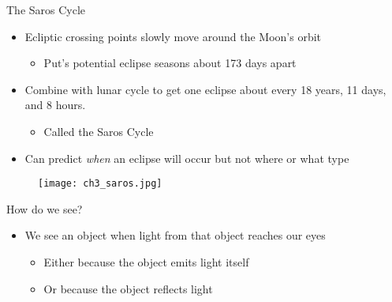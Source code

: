 \documentclass[pdf,aspectratio=169]{beamer}
\begin{document}
\begin{frame}{The Saros Cycle}
  \begin{itemize}
	\item Ecliptic crossing points slowly move around the Moon's orbit
	  \begin{itemize}
		\item Put's potential eclipse seasons about 173 days apart
	  \end{itemize}
	\item Combine with lunar cycle to get one eclipse about every 18 years, 11 days, and 8 hours.
	  \begin{itemize}
		\item Called the \alert{Saros Cycle}
	  \end{itemize}
	\item Can predict \emph{when} an eclipse will occur but not where or what type
  \end{itemize}
  \begin{figure}[h!]
	\centering
	\texttt{[image: ch3\_saros.jpg]}
  \end{figure}
\end{frame}


\begin{frame}{How do we see?}
  \begin{itemize}
	\item We see an object when light from that object reaches our eyes
	  \begin{itemize}
		\item \textcolor<2>{yellow!50!orange}{Either because the object emits light itself}
		\item \textcolor<3>{orange!50!red}{Or because the object reflects light}
	  \end{itemize}
  \end{itemize}
  \begin{center}
  \end{center}
\end{frame}
\end{document}

